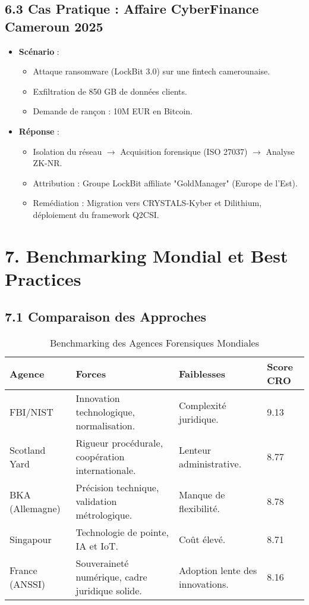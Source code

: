 \documentclass[12pt, a4paper]{report}
\begin{document}
\subsection*{6.3 Cas Pratique : Affaire CyberFinance Cameroun 2025}
\begin{itemize}
    \item \textbf{Scénario} :
    \begin{itemize}
        \item Attaque ransomware (LockBit 3.0) sur une fintech camerounaise.
        \item Exfiltration de 850 GB de données clients.
        \item Demande de rançon : 10M EUR en Bitcoin.
    \end{itemize}
    \item \textbf{Réponse} :
    \begin{itemize}
        \item Isolation du réseau $\rightarrow$ Acquisition forensique (ISO 27037) $\rightarrow$ Analyse ZK-NR.
        \item Attribution : Groupe LockBit affiliate "GoldManager" (Europe de l’Est).
        \item Remédiation : Migration vers CRYSTALS-Kyber et Dilithium, déploiement du framework Q2CSI.
    \end{itemize}
\end{itemize}

\newpage
\section*{7. Benchmarking Mondial et Best Practices}
\subsection*{7.1 Comparaison des Approches}
\begin{table}[h]
    \centering
    \caption{Benchmarking des Agences Forensiques Mondiales}
    \begin{tabular}{|l|l|l|l|}
        \hline
        \textbf{Agence} & \textbf{Forces} & \textbf{Faiblesses} & \textbf{Score CRO} \\ \hline
        FBI/NIST & Innovation technologique, normalisation. & Complexité juridique. & 9.13 \\ \hline
        Scotland Yard & Rigueur procédurale, coopération internationale. & Lenteur administrative. & 8.77 \\ \hline
        BKA (Allemagne) & Précision technique, validation métrologique. & Manque de flexibilité. & 8.78 \\ \hline
        Singapour & Technologie de pointe, IA et IoT. & Coût élevé. & 8.71 \\ \hline
        France (ANSSI) & Souveraineté numérique, cadre juridique solide. & Adoption lente des innovations. & 8.16 \\ \hline
    \end{tabular}
\end{table}
\end{document}
